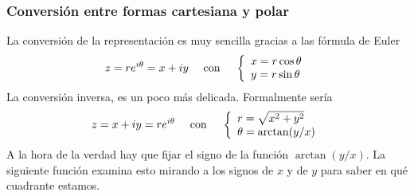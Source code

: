 \documentclass[letterpaper,10pt,english]{jupyterBook}
\begin{document}
\subsubsection{Conversión entre formas cartesiana y polar}
\label{\detokenize{docs/Part_01_Formalismo/Chapter_01_02_Formalismo_matem_xe1tico/01_01_Numeros_Complejos_myst:conversion-entre-formas-cartesiana-y-polar}}
\sphinxAtStartPar
La conversión de la representación  es muy sencilla
gracias a las fórmula de Euler
\begin{equation*}
\begin{split}
z = r e^{i\theta} = x + i y ~~~\hbox{ con }  ~~~\left\{\begin{array}{l} x=r \cos \theta \\ \rule{0mm}{4mm} y = r\sin \theta
\end{array} \right.
\end{split}
\end{equation*}
\sphinxAtStartPar
La conversión inversa,  es un poco más delicada. Formalmente sería
\begin{equation*}
\begin{split}
z = x + i y  = r e^{i\theta} ~~~ \hbox{ con } ~~~ \left\{\begin{array}{l} r=\sqrt{x^2+y^2} \\  \rule{0mm}{4mm} \theta = \arctan(y/x)
\end{array} \right.
\end{split}
\end{equation*}
\sphinxAtStartPar
A la hora de la verdad hay que fijar el signo de la función \(\arctan(y/x)\). La siguiente función examina esto mirando a los signos de \(x\) y de \(y\) para saber en qué cuadrante estamos.
\end{document}
